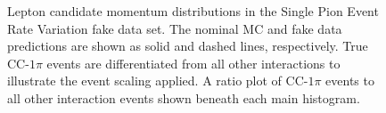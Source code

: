 \begin{figure}
\begin{centering}
\par\end{centering}
\begin{centering}
\par\end{centering}
\caption[Lepton Candidate Momentum Distributions in the Single Pion Event Rate
Variation Fake Data Set]{Lepton candidate momentum distributions in the Single Pion Event Rate
Variation fake data set. The nominal MC and fake data predictions
are shown as solid and dashed lines, respectively. True CC-$1\pi$
events are differentiated from all other interactions to illustrate
the event scaling applied. A ratio plot of CC-$1\pi$ events to all
other interaction events shown beneath each main histogram. \label{fig:lepton-moentum-single-pion-fake-data}}
\end{figure}
